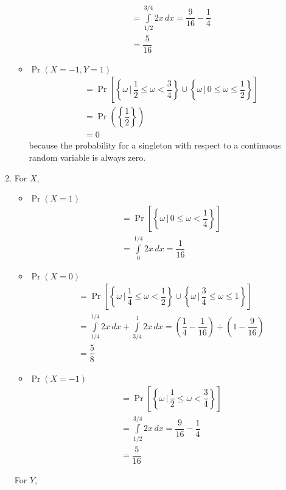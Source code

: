 \documentclass[answers]{exam}
\begin{document}
\begin{questions}
\begin{solution}
\begin{enumerate}[(1)]
\begin{itemize}
\begin{align}
          &= \int\limits_{1/2}^{3/4}2x\,dx = \dfrac{9}{16}-\dfrac{1}{4}\\
          &= \dfrac{5}{16}
        \end{align}
        \item $\Pr(X=-1,Y=1)$
        \begin{align}
          &= \Pr\left[\left\lbrace \omega\,|\, \dfrac{1}{2}\leq \omega < \dfrac{3}{4}\right\rbrace \cup \left\lbrace \omega\,|\,0\leq \omega \leq \dfrac{1}{2} \right\rbrace \right]\\
          &= \Pr\left(\left\lbrace\dfrac{1}{2} \right\rbrace \right)\\
          &= 0
        \end{align}
        because the probability for a singleton with respect to a continuous random variable is always zero.
      \end{itemize}
      \item For $X$,
      \begin{itemize}
        \item $\Pr(X=1)$
        \begin{align}
          &= \Pr\left[\left\lbrace \omega\,|\, 0\leq \omega < \dfrac{1}{4}\right\rbrace \right]\\
          &= \int\limits_{0}^{1/4}2x\,dx = \dfrac{1}{16}
        \end{align}
        \item $\Pr(X=0)$
        \begin{align}
          &= \Pr\left[\left\lbrace \omega\,|\,\dfrac{1}{4}\leq \omega < \dfrac{1}{2}\right\rbrace \cup \left\lbrace \omega\,|\, \dfrac{3}{4}\leq \omega\leq 1\right\rbrace \right]\\
          &= \int\limits_{1/4}^{1/4}2x\,dx + \int\limits_{3/4}^{1}2x\,dx= \left( \dfrac{1}{4}-\dfrac{1}{16}\right)+\left(1-\dfrac{9}{16}\right) \\
          &= \dfrac{5}{8}
        \end{align}
        \item $\Pr(X=-1)$
        \begin{align}
          &= \Pr\left[\left\lbrace \omega\,|\,\dfrac{1}{2}\leq \omega < \dfrac{3}{4}\right\rbrace \right]\\
          &= \int\limits_{1/2}^{3/4}2x\,dx = \dfrac{9}{16}-\dfrac{1}{4}\\
          &= \dfrac{5}{16}
        \end{align}
      \end{itemize}
      For $Y$,
      \begin{itemize}

\end{itemize}
\end{enumerate}
\end{solution}
\end{questions}
\end{document}
